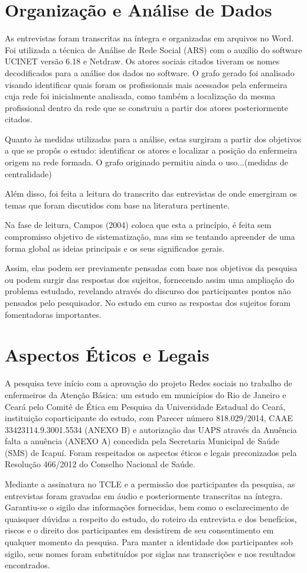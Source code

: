 \section{Organização e Análise de Dados}
As entrevistas foram transcritas na íntegra e organizadas em arquivos no Word. Foi utilizada a técnica de Análise de Rede Social (ARS) com o auxílio do software UCINET versão 6.18 e Netdraw. Os atores sociais citados tiveram os nomes decodificados para a análise dos dados no software. O grafo gerado foi analisado visando identificar quais foram os profissionais mais acessados pela enfermeira cuja rede foi inicialmente analisada, como também a localização da mesma profissional dentro da rede que se construiu a partir dos atores posteriormente citados.

Quanto às medidas utilizadas para a análise, estas surgiram a partir dos objetivos a que se propôs o estudo: identificar os atores e localizar a posição da enfermeira origem na rede formada. O grafo originado permitiu ainda o uso...(medidas de centralidade)   

Além disso, foi feita a leitura do transcrito das entrevistas de onde emergiram os temas que foram discutidos com base na literatura pertinente. 

Na fase de leitura, Campos (2004) coloca que esta a princípio, é feita sem compromisso objetivo de  sistematização, mas sim se tentando apreender de uma forma global as ideias principais e os seus significados gerais.  

Assim, elas podem ser previamente pensadas com base nos objetivos da pesquisa ou podem  surgir das respostas dos sujeitos, fornecendo assim uma ampliação do problema estudado, revelando através do discurso dos participantes pontos não pensados pelo pesquisador. No estudo em curso as respostas dos sujeitos foram fomentadoras importantes.

\section{Aspectos Éticos e Legais}
A pesquisa teve início com a aprovação do projeto Redes sociais no trabalho de enfermeiros da Atenção Básica: um estudo em municípios do Rio de Janeiro e Ceará pelo Comitê de Ética em Pesquisa da Universidade Estadual do Ceará, instituição coparticipante do estudo, com Parecer número 818.029/2014, CAAE 33423114.9.3001.5534 (ANEXO B) e autorização das UAPS através da Anuência falta a anuência (ANEXO A) concedida pela Secretaria Municipal de Saúde (SMS) de Icapuí. Foram respeitados os aspectos éticos e legais preconizados pela Resolução 466/2012 do Conselho Nacional de Saúde. 

Mediante a assinatura no TCLE e a permissão dos participantes da pesquisa, as entrevistas foram gravadas em áudio e posteriormente transcritas na íntegra. Garantiu-se o sigilo das informações fornecidas, bem como o esclarecimento de quaisquer dúvidas a respeito do estudo, do roteiro da entrevista e dos benefícios, riscos e o direito dos participantes em desistirem de seu consentimento em qualquer momento da pesquisa. Para manter a identidade dos participantes sob sigilo, seus nomes foram substituídos por siglas nas transcrições e nos resultados encontrados.

